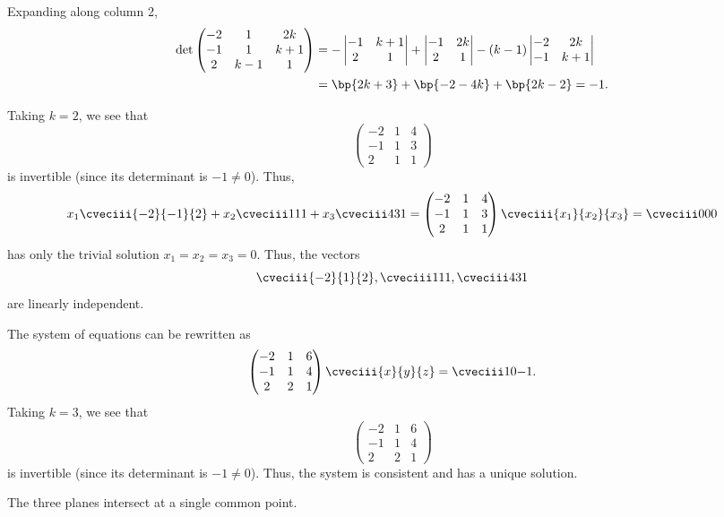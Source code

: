 \begin{solution}
    \begin{ppart}
        Expanding along column 2,
        \begin{align*}
            \det \begin{pmatrix}-2 & 1 & 2k\\ -1 & 1 & k+1\\ 2 & k-1 & 1\end{pmatrix} &= -\begin{vmatrix}-1 & k+1 \\ 2 & 1\end{vmatrix} + \begin{vmatrix}-1 & 2k \\ 2 & 1\end{vmatrix} - (k-1) \begin{vmatrix}-2 & 2k \\ -1 & k + 1\end{vmatrix}\\
            &= \bp{2k + 3} + \bp{-2 - 4k} + \bp{2k - 2} = -1.
        \end{align*}
    \end{ppart}
    \begin{ppart}
        Taking $k = 2$, we see that \[\begin{pmatrix}-2 & 1 & 4\\ -1 & 1 & 3\\ 2 & 1 & 1\end{pmatrix}\] is invertible (since its determinant is $-1 \neq 0$). Thus, \[x_1 \cveciii{-2}{-1}{2} + x_2 \cveciii111 + x_3 \cveciii431 = \begin{pmatrix}-2 & 1 & 4\\ -1 & 1 & 3\\ 2 & 1 & 1\end{pmatrix} \cveciii{x_1}{x_2}{x_3} = \cveciii000\] has only the trivial solution $x_1 = x_2 = x_3 = 0$. Thus, the vectors \[\cveciii{-2}{1}{2}, \cveciii111, \cveciii431\] are linearly independent.
    \end{ppart}
    \begin{ppart}
        \begin{psubpart}
            The system of equations can be rewritten as \[\begin{pmatrix}-2 & 1 & 6\\ -1 & 1 & 4\\ 2 & 2 & 1\end{pmatrix} \cveciii{x}{y}{z} = \cveciii10{-1}.\] Taking $k = 3$, we see that \[\begin{pmatrix}-2 & 1 & 6\\ -1 & 1 & 4\\ 2 & 2 & 1\end{pmatrix}\] is invertible (since its determinant is $-1 \neq 0$). Thus, the system is consistent and has a unique solution.
        \end{psubpart}
        \begin{psubpart}
            The three planes intersect at a single common point.
        \end{psubpart}
    \end{ppart}
\end{solution}

